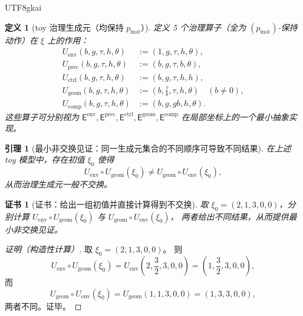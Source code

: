 \documentclass[12pt]{article}
\newtheorem{definition}{定义}[section]
\newtheorem{lemma}{引理}[section]
\newtheorem{certificate}{证书}[section]
\begin{document}
\begin{CJK*}{UTF8}{gkai}
\begin{definition}[toy 治理生成元（均保持 $p_{\mathrm{mat}}$）]
\label{def:toy-governance-operators}
定义 5 个治理算子（全为 $(p_{\mathrm{mat}})$-保持动作）在 $\xi$ 上的作用：
\[
\begin{aligned}
U_{\mathrm{env}}(b,g,\tau,h,\theta)&:=(1,g,\tau,h,\theta),\\
U_{\mathrm{prec}}(b,g,\tau,h,\theta)&:=(b,g,\tau,b,\theta),\\
U_{\mathrm{ctrl}}(b,g,\tau,h,\theta)&:=(b,g,\tau,h,h),\\
U_{\mathrm{geom}}(b,g,\tau,h,\theta)&:=\left(b,\frac{\tau}{b},\tau,h,\theta\right)\quad(b\neq 0),\\
U_{\mathrm{comp}}(b,g,\tau,h,\theta)&:=(b,g,gb,h,\theta).
\end{aligned}
\]
这些算子可分别视为 $\mathsf{E}^{\mathrm{env}},\mathsf{E}^{\mathrm{prec}},\mathsf{E}^{\mathrm{ctrl}},\mathsf{E}^{\mathrm{geom}},
  \mathsf{E}^{\mathrm{comp}}$
在局部坐标上的一个最小抽象实现。
\end{definition}

\begin{lemma}[最小非交换见证：同一生成元集合的不同顺序可导致不同结果]
\label{lem:toy-noncommutative-witness}
在上述 toy 模型中，存在初值 $\xi_0$ 使得
\[
U_{\mathrm{env}}\circ U_{\mathrm{geom}}(\xi_0)\neq U_{\mathrm{geom}}\circ U_{\mathrm{env}}(\xi_0),
\]
从而治理生成元一般不交换。
\end{lemma}

\begin{certificate}[证书：给出一组初值并直接计算得到不交换]
\label{cert:toy-noncommutative-witness}
取 $\xi_0=(2,1,3,0,0)$，分别计算 $U_{\mathrm{env}}\circ U_{\mathrm{geom}}(\xi_0)$ 与 $U_{\mathrm{geom}}\circ U_{\mathrm{env}}
  (\xi_0)$，
两者给出不同结果，从而提供最小非交换见证。
\end{certificate}

\begin{proof}[证明（构造性计算）]
取 $\xi_0=(2,1,3,0,0)$。
则
\[
U_{\mathrm{env}}\circ U_{\mathrm{geom}}(\xi_0)
=
U_{\mathrm{env}}\left(2,\frac{3}{2},3,0,0\right)
=
\left(1,\frac{3}{2},3,0,0\right),
\]
而
\[
U_{\mathrm{geom}}\circ U_{\mathrm{env}}(\xi_0)
=
U_{\mathrm{geom}}(1,1,3,0,0)
=
(1,3,3,0,0),
\]
两者不同。证毕。
\end{proof}


\end{CJK*}
\end{document}
